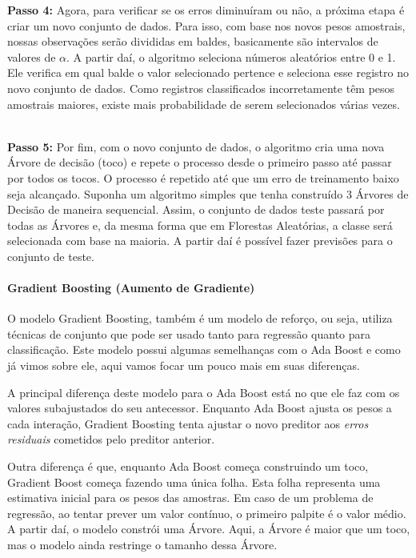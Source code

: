 \documentclass[
  letterpaper,
  DIV=11,
  numbers=noendperiod]{scrreprt}
\let\oldparagraph\paragraph
\renewcommand{\paragraph}[1]{\oldparagraph{#1}\mbox{}}
\begin{document}
\begin{itemize}
  \textbf{Passo 4:} Agora, para verificar se os erros diminuíram ou não,
  a próxima etapa é criar um novo conjunto de dados. Para isso, com base
  nos novos pesos amostrais, nossas observações serão divididas em
  baldes, basicamente são intervalos de valores de \(\alpha\). A partir
  daí, o algoritmo seleciona números aleatórios entre 0 e 1. Ele
  verifica em qual balde o valor selecionado pertence e seleciona esse
  registro no novo conjunto de dados. Como registros classificados
  incorretamente têm pesos amostrais maiores, existe mais probabilidade
  de serem selecionados várias vezes.\\
  \strut \\
  \textbf{Passo 5:} Por fim, com o novo conjunto de dados, o algoritmo
  cria uma nova Árvore de decisão (toco) e repete o processo desde o
  primeiro passo até passar por todos os tocos. O processo é repetido
  até que um erro de treinamento baixo seja alcançado. Suponha um
  algoritmo simples que tenha construído 3 Árvores de Decisão de maneira
  sequencial. Assim, o conjunto de dados teste passará por todas as
  Árvores e, da mesma forma que em Florestas Aleatórias, a classe será
  selecionada com base na maioria. A partir daí é possível fazer
  previsões para o conjunto de teste.
\end{itemize}

\hypertarget{gradient-boosting-aumento-de-gradiente}{%
\paragraph{Gradient Boosting (Aumento de
Gradiente)}\label{gradient-boosting-aumento-de-gradiente}}

O modelo Gradient Boosting, também é um modelo de reforço, ou seja,
utiliza técnicas de conjunto que pode ser usado tanto para regressão
quanto para classificação. Este modelo possui algumas semelhanças com o
Ada Boost e como já vimos sobre ele, aqui vamos focar um pouco mais em
suas diferenças.

A principal diferença deste modelo para o Ada Boost está no que ele faz
com os valores subajustados do seu antecessor. Enquanto Ada Boost ajusta
os pesos a cada interação, Gradient Boosting tenta ajustar o novo
preditor aos \emph{erros residuais} cometidos pelo preditor anterior.

Outra diferença é que, enquanto Ada Boost começa construindo um toco,
Gradient Boost começa fazendo uma única folha. Esta folha representa uma
estimativa inicial para os pesos das amostras. Em caso de um problema de
regressão, ao tentar prever um valor contínuo, o primeiro palpite é o
valor médio. A partir daí, o modelo constrói uma Árvore. Aqui, a Árvore
é maior que um toco, mas o modelo ainda restringe o tamanho dessa
Árvore.
\end{document}
